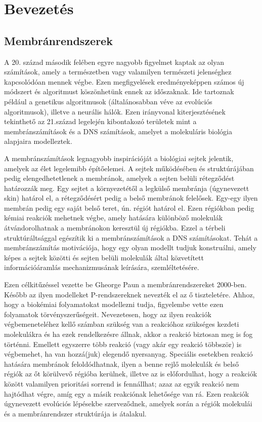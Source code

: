 \chapter{Bevezetés}
\label{ch:intro}


\section{Membránrendszerek}

A 20. század második felében egyre nagyobb figyelmet kaptak az olyan számítások, amely a természetben vagy valamilyen természeti jelenséghez kapcsolódóan mennek végbe. Ezen megfigyelések eredményeképpen számos új módszert és algoritmust köszönhetünk ennek az időszaknak. Ide tartoznak például a genetikus algoritmusok (általánosabban véve az evolúciós algoritmusok), illetve a neurális hálók. Ezen irányvonal kiterjesztésének tekinthető az 21.század legelején kibontakozó területek mint a membránszámítások és a DNS számítások, amelyet a molekuláris biológia alapjaira modelleztek.

A membránszámítások legnagyobb inspirációját a biológiai sejtek jelentik, amelyek az élet legelemibb építőelemei. A sejtek működésében és struktúrájában pedig elengedhetetlenek a membránok, amelyek a sejten belüli rétegződést határozzák meg. Egy sejtet a környezetétől a legkülső membránja (úgynevezett skin) határol el, a rétegződésért pedig a belső membránok felelősek.  Egy-egy ilyen membrán pedig egy saját belső teret, ún. régiót határol el.
Ezen régiókban pedig kémiai reakciók mehetnek végbe, amely hatására különböző molekulák átvándorolhatnak a membránokon keresztül új régiókba. Ezzel a térbeli struktúráltsággal egészítik ki a membránszámítások a DNS számításokat. Tehát a membránszámítás motivációja, hogy egy olyan modellt tudjuk konstruálni, amely képes a sejtek közötti és sejten belüli molekulák által közvetített információáramlás mechanizmusának leírására, szemléltetésére.

Ezen célkitűzéssel vezette be Gheorge Paun a membránrendszereket 2000-ben. Később az ilyen modelleket P-rendszereknek nevezték el az ő tiszteletére. Ahhoz, hogy a biokémiai folyamatokat modellezni tudja, figyelembe vette ezen folyamatok törvényszerűségeit. Nevezetesen, hogy az ilyen reakciók végbemeneteléhez kellő számban szükség van a reakcióhoz szükséges kezdeti molekulákra és ha ezek rendelkezésre állnak, akkor a reakció biztosan meg is fog történni. Emellett egyszerre több reakció (vagy akár egy reakció többször) is végbemehet, ha van hozzá(juk) elegendő nyersanyag. Speciális esetekben reakció hatására membránok feloldódhatnak, ilyen a benne rejlő molekulák és belső régiók az őt körülvevő régióba kerülnek, illetve az is előfordulhat, hogy a reakciók között valamilyen prioritási sorrend is fennállhat; azaz az egyik reakció nem hajtódhat végre, amíg egy a másik reakciónak lehetősége van rá. Ezen reakciók úgynevezett evolúciós lépésekbe szerveződnek, amelyek során a régiók molekulái és a membránrendszer struktúrája is átalakul.

